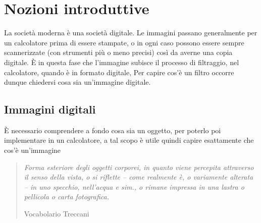 \chapter{Nozioni introduttive}
La società moderna è una società digitale. Le immagini passano generalmente per un calcolatore prima di essere stampate, o in ogni caso possono essere sempre scannerizzate (con strumenti più o meno precisi) così da averne una copia digitale.
\`E in questa fase che l'immagine subisce il processo di filtraggio, nel calcolatore, quando è in formato digitale, Per capire cos'è un filtro occorre dunque chiedersi cosa sia un'immagine digitale.

\section{Immagini digitali}
\`E necessario comprendere a fondo cosa sia un oggetto, per poterlo poi implementare in un calcolatore, a tal scopo è utile quindi capire esattamente che cos'è un'immagine

\begin{quote}
\epigraph{\textit{Forma esteriore degli oggetti corporei, in quanto viene percepita attraverso il senso della vista, o si riflette – come realmente è, o variamente alterata – in uno specchio, nell’acqua e sim., o rimane impressa in una lastra o pellicola o carta fotografica.}}{Vocabolario Treccani}
\end{quote}

    


